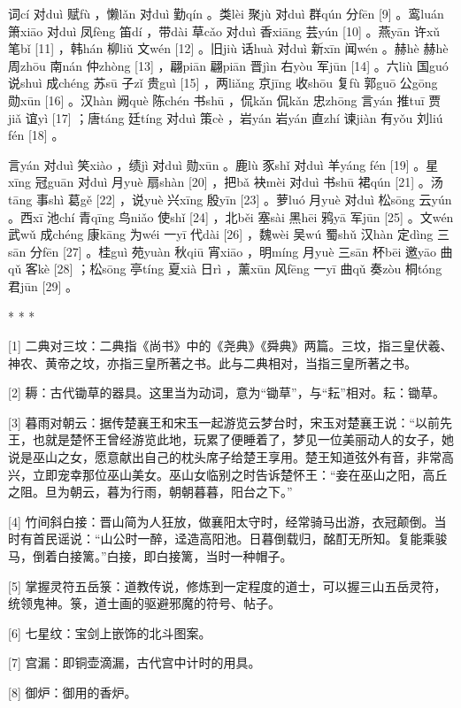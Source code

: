 \documentclass[12pt,UTF8]{ctexbook}
\begin{document}
词cí 对duì 赋fù ，懒lǎn 对duì 勤qín 。类lèi 聚jù 对duì 群qún 分fēn [9] 。鸾luán 箫xiāo 对duì 凤fèng 笛dí ，带dài 草cǎo 对duì 香xiāng 芸yún [10] 。燕yān 许xǔ 笔bǐ [11] ，韩hán 柳liǔ 文wén [12] 。旧jiù 话huà 对duì 新xīn 闻wén 。赫hè 赫hè 周zhōu 南nán 仲zhòng [13] ，翩piān 翩piān 晋jìn 右yòu 军jūn [14] 。六liù 国guó 说shuì 成chéng 苏sū 子zǐ 贵guì [15] ，两liǎng 京jīng 收shōu 复fù 郭guō 公gōng 勋xūn [16] 。汉hàn 阙què 陈chén 书shū ，侃kǎn 侃kǎn 忠zhōng 言yán 推tuī 贾jiǎ 谊yì [17] ；唐táng 廷tíng 对duì 策cè ，岩yán 岩yán 直zhí 谏jiàn 有yǒu 刘liú fén [18] 。

言yán 对duì 笑xiào ，绩jì 对duì 勋xūn 。鹿lù 豕shǐ 对duì 羊yáng fén [19] 。星xīng 冠guān 对duì 月yuè 扇shàn [20] ，把bǎ 袂mèi 对duì 书shū 裙qún [21] 。汤tāng 事shì 葛gě [22] ，说yuè 兴xīng 殷yīn [23] 。萝luó 月yuè 对duì 松sōng 云yún 。西xī 池chí 青qīng 鸟niǎo 使shǐ [24] ，北běi 塞sài 黑hēi 鸦yā 军jūn [25] 。文wén 武wǔ 成chéng 康kāng 为wéi 一yī 代dài [26] ，魏wèi 吴wú 蜀shǔ 汉hàn 定dìng 三sān 分fēn [27] 。桂guì 苑yuàn 秋qiū 宵xiāo ，明míng 月yuè 三sān 杯bēi 邀yāo 曲qǔ 客kè [28] ；松sōng 亭tíng 夏xià 日rì ，薰xūn 风fēng 一yī 曲qǔ 奏zòu 桐tóng 君jūn [29] 。



* * *



[1] 二典对三坟：二典指《尚书》中的《尧典》《舜典》两篇。三坟，指三皇伏羲、神农、黄帝之坟，亦指三皇所著之书。此与二典相对，当指三皇所著之书。

[2] 耨：古代锄草的器具。这里当为动词，意为“锄草”，与“耘”相对。耘：锄草。

[3] 暮雨对朝云：据传楚襄王和宋玉一起游览云梦台时，宋玉对楚襄王说：“以前先王，也就是楚怀王曾经游览此地，玩累了便睡着了，梦见一位美丽动人的女子，她说是巫山之女，愿意献出自己的枕头席子给楚王享用。楚王知道弦外有音，非常高兴，立即宠幸那位巫山美女。巫山女临别之时告诉楚怀王：“妾在巫山之阳，高丘之阻。旦为朝云，暮为行雨，朝朝暮暮，阳台之下。”

[4] 竹间斜白接：晋山简为人狂放，做襄阳太守时，经常骑马出游，衣冠颠倒。当时有首民谣说：“山公时一醉，迳造高阳池。日暮倒载归，酩酊无所知。复能乘骏马，倒着白接篱。”白接，即白接篱，当时一种帽子。

[5] 掌握灵符五岳箓：道教传说，修炼到一定程度的道士，可以握三山五岳灵符，统领鬼神。箓，道士画的驱避邪魔的符号、帖子。

[6] 七星纹：宝剑上嵌饰的北斗图案。

[7] 宫漏：即铜壶滴漏，古代宫中计时的用具。

[8] 御炉：御用的香炉。
\end{document}
